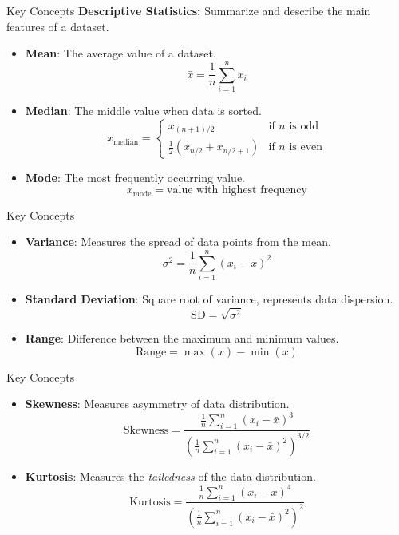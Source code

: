 \documentclass{beamer}
\begin{document}
\begin{frame}{Key Concepts}
\textbf{Descriptive Statistics:} Summarize and describe the main features of a dataset.
\begin{itemize}
    \item \textbf{Mean}: The average value of a dataset.
    $$ \bar{x} = \frac{1}{n} \sum_{i=1}^{n} x_i $$
    \item \textbf{Median}: The middle value when data is sorted.
    $$ x_{\text{median}} = \begin{cases} x_{(n+1)/2} & \text{if } n \text{ is odd} \\ \frac{1}{2} (x_{n/2} + x_{n/2+1}) & \text{if } n \text{ is even} \end{cases} $$
    \item \textbf{Mode}: The most frequently occurring value.
    $$ x_{\text{mode}} = \text{value with highest frequency} $$
\end{itemize}
\end{frame}

\begin{frame}{Key Concepts}
\begin{itemize}
    \item \textbf{Variance}: Measures the spread of data points from the mean.
    $$ \sigma^2 = \frac{1}{n} \sum_{i=1}^{n} (x_i - \bar{x})^2 $$
    \item \textbf{Standard Deviation}: Square root of variance, represents data dispersion.
    $$ \text{SD} = \sqrt{\sigma^2} $$
    \item \textbf{Range}: Difference between the maximum and minimum values.
    $$ \text{Range} = \max(x) - \min(x) $$
\end{itemize}
\end{frame}

\begin{frame}{Key Concepts}
\begin{itemize}
    \item \textbf{Skewness}: Measures asymmetry of data distribution.
    $$ \text{Skewness} = \frac{\frac{1}{n} \sum_{i=1}^{n} (x_i - \bar{x})^3}{\left(\frac{1}{n} \sum_{i=1}^{n} (x_i - \bar{x})^2\right)^{3/2}} $$
    \item \textbf{Kurtosis}: Measures the \textit{tailedness} of the data distribution.
    $$ \text{Kurtosis} = \frac{\frac{1}{n} \sum_{i=1}^{n} (x_i - \bar{x})^4}{\left(\frac{1}{n} \sum_{i=1}^{n} (x_i - \bar{x})^2\right)^2} $$
\end{itemize}
\end{frame}
\end{document}
